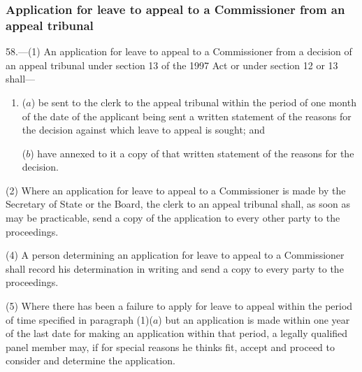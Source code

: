 \documentclass[12pt,a4paper]{article}
\begin{document}
\subsubsection[58. Application for leave to appeal to a Commissioner from an appeal tribunal]{Application for leave to appeal to a Commissioner from an appeal tribunal}

58.—(1) An application for leave to appeal to a Commissioner from a decision of an appeal tribunal under 
section 13 of the 1997 Act or under  %
section 12 or 13 shall—
\begin{enumerate}\item[]
($a$) be 
sent to the clerk to the appeal tribunal within the period of one month of the date of the applicant being sent  %
a written statement of the reasons for the decision against which leave to appeal is sought; and

($b$) have annexed to it a copy of that written statement of the reasons for the decision.
\end{enumerate}

(2) Where an application for leave to appeal to a Commissioner is made by the Secretary of State
or the Board,  %
the clerk to an appeal tribunal shall, as soon as may be practicable, send a copy of the application to every other party to the proceedings.



(4) A person determining an application for leave to appeal to a Commissioner shall record his determination in writing and send a copy to every party to the proceedings.

(5) Where there has been a failure to apply for leave to appeal within the period of time specified in paragraph (1)($a$) but an application is made within one year of the last date for making an application within that period, a legally qualified panel member may, if for special reasons he thinks fit, accept and proceed to consider and determine the application.
\end{document}
